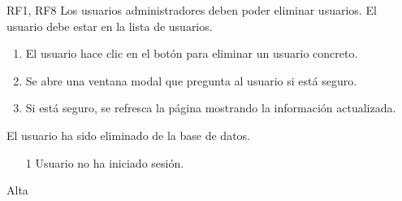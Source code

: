 {RF1, RF8}
{Los usuarios administradores deben poder eliminar usuarios.}
{El usuario debe estar en la lista de usuarios.}
{
    \begin{enumerate}
        \def\labelenumi{\arabic{enumi}.}
        \tightlist
        \item El usuario hace clic en el botón para eliminar un usuario concreto.
        \item Se abre una ventana modal que pregunta al usuario si está seguro.
        \item Si está seguro, se refresca la página mostrando la información actualizada.
    \end{enumerate}
}
{
    El usuario ha sido eliminado de la base de datos.
}
{
    \begin{itemize}
        \item [1] Usuario no ha iniciado sesión.
    \end{itemize}
}
{Alta}